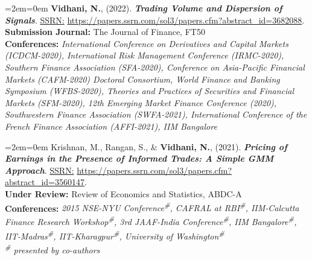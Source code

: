 \documentclass[11pt,a4paper,]{moderncv}
\begin{document}
\bgroup %
  \par%
  \medskip
  \leftskip=2em\rightskip=0em%
  \noindent\ignorespaces
\textbf{Vidhani, N.}, (2022). \textbf{\textit{Trading Volume and Dispersion of Signals}}. \underline{SSRN:} \url{https://papers.ssrn.com/sol3/papers.cfm?abstract_id=3682088}.\\
\textbf{Submission Journal:} The Journal of Finance, FT50\\
\textbf{Conferences:} \textit{International Conference on Derivatives and Capital Markets (ICDCM-2020), International Risk Management Conference (IRMC-2020), Southern Finance Association (SFA-2020), Conference on Asia-Pacific Financial Markets (CAFM-2020) Doctoral Consortium, World Finance and Banking Symposium (WFBS-2020), Theories and Practices of Securities and Financial Markets (SFM-2020), 12th Emerging Market Finance Conference (2020), Southwestern Finance Association (SWFA-2021), International Conference of the French Finance Association (AFFI-2021), IIM Bangalore}\\
%
  \par\medskip\egroup

\bgroup %
  \par%
  \medskip
  \leftskip=2em\rightskip=0em%
  \noindent\ignorespaces
Krishnan, M., Rangan, S., \& \textbf{Vidhani, N.}, (2021). \textbf{\textit{Pricing of Earnings in the Presence of Informed Trades: A Simple GMM Approach}}. \underline{SSRN:} \url{https://papers.ssrn.com/sol3/papers.cfm?abstract_id=3560147}.\\
\textbf{Under Review:} Review of Economics and Statistics, ABDC-A\textsuperscript{\textasteriskcentered}\\
\textbf{Conferences:} \textit{2015 NSE-NYU Conference\textsuperscript{\#}, CAFRAL at RBI\textsuperscript{\#}, IIM-Calcutta Finance Research Workshop\textsuperscript{\#}, 3rd JAAF-India Conference\textsuperscript{\#}, IIM Bangalore\textsuperscript{\#}, IIT-Madras\textsuperscript{\#}, IIT-Kharagpur\textsuperscript{\#}, University of Washington\textsuperscript{\#}}\\
\textit{\textsuperscript{\#} presented by co-authors}\\
%
  \par\medskip\egroup

\endgroup
\end{document}
